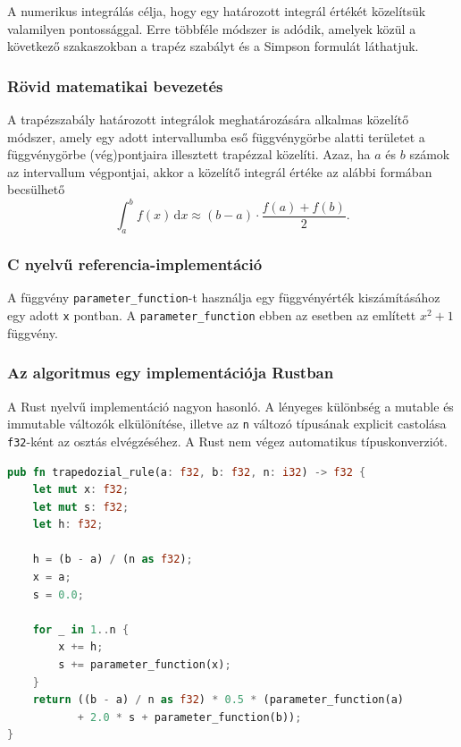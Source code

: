 
A numerikus integrálás célja, hogy egy határozott integrál értékét közelítsük valamilyen pontossággal. Erre többféle módszer is adódik, amelyek közül a következő szakaszokban a trapéz szabályt és a Simpson formulát láthatjuk.


\subsubsection{Rövid matematikai bevezetés}

A trapézszabály határozott integrálok meghatározására alkalmas közelítő módszer, amely egy adott intervallumba eső függvénygörbe alatti területet a függvénygörbe (vég)pontjaira illesztett trapézzal közelíti. Azaz, ha $a$ és $b$ számok az intervallum végpontjai, akkor a közelítő integrál értéke az alábbi formában becsülhető
\[
\int_{a}^{b} \! f(x) \, \textrm{d} x \approx (b - a) \cdot \frac{f(a) + f(b)}{2}.
\]

\subsubsection{C nyelvű referencia-implementáció}
A függvény \lstinline{parameter_function}-t használja egy függvényérték kiszámításához egy adott \lstinline{x} pontban.
A \lstinline{parameter_function} ebben az esetben az említett \(x^2 + 1\) függvény.

\subsubsection{Az algoritmus egy implementációja Rustban}

A Rust nyelvű implementáció nagyon hasonló. A lényeges különbség a mutable és immutable változók elkülönítése, illetve az \lstinline{n} változó típusának explicit castolása \lstinline{f32}-ként az osztás elvégzéséhez. A Rust nem végez automatikus típuskonverziót.
\begin{lstlisting}[language=Rust, style=boxed]
pub fn trapedozial_rule(a: f32, b: f32, n: i32) -> f32 {
    let mut x: f32;
    let mut s: f32;
    let h: f32;

    h = (b - a) / (n as f32);
    x = a;
    s = 0.0;

    for _ in 1..n {
        x += h;
        s += parameter_function(x);
    }
    return ((b - a) / n as f32) * 0.5 * (parameter_function(a)
           + 2.0 * s + parameter_function(b));
}
\end{lstlisting}

